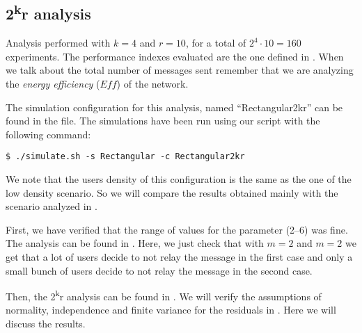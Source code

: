 \subsection{2\texorpdfstring{\textsuperscript{k}}{k}r
analysis}\label{subsec:rect2kr}

Analysis performed with \(k\!=\!4\) and \(r\!=\!10\), for a total of \(2^4 \cdot
10 \!=\!160\) experiments. The performance indexes evaluated are the one defined
in . When we talk about the total number of messages sent
remember that we are analyzing the \emph{energy efficiency} (\(\mathit{Eff}\))
of the network.

The simulation configuration for this analysis, named ``Rectangular2kr'' can be
found in the  file. The simulations have been run using
our  script with the following command:
\begin{verbatim}
$ ./simulate.sh -s Rectangular -c Rectangular2kr
\end{verbatim}

We note that the users density of this configuration is the same as the one of
the low density scenario. So we will compare the results obtained mainly with
the scenario analyzed in .

First, we have verified that the range of values for the 
parameter (2--6) was fine. The analysis can be found in .
Here, we just check that with \(m\!=\!2\) and \(m\!=\!2\) we get that a lot of
users decide to not relay the message in the first case and only a small bunch
of users decide to not relay the message in the second case.

Then, the 2\textsuperscript{k}r analysis can be found in . We
will verify the assumptions of normality, independence and finite variance for
the residuals in . Here we will discuss the
results.





